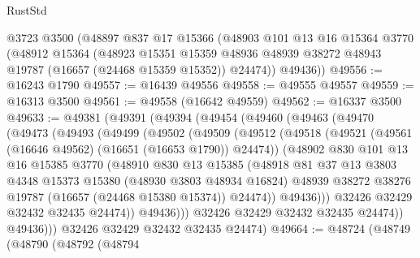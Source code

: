 \begin{lexlean}{RustStd}
\begin{coremodule}
    @3723
    @3500
    (@48897
      @837
      @17
      @15366
      (@48903
        @101
        @13
        @16
        @15364
        @3770
        (@48912
          @15364
          (@48923
            @15351
            @15359
            @48936
            @48939
            @38272
            @48943
            @19787
            (@16657 (@24468 @15359 @15352))
            @24474))
        @49436))
@49556 := @16243 @1790
@49557 := @16439 @49556
@49558 := @49555 @49557
@49559 := @16313 @3500
@49561 := @49558 (@16642 @49559)
@49562 := @16337 @3500
@49633 := @49381
    (@49391
      (@49394
        (@49454
          (@49460
            (@49463
              (@49470
                (@49473
                  (@49493
                    (@49499
                      (@49502
                        (@49509
                          (@49512
                            (@49518
                              (@49521 (@49561 (@16646 @49562) (@16651 (@16653 @1790)) @24474))
                              (@48902
                                @830
                                @101
                                @13
                                @16
                                @15385
                                @3770
                                (@48910
                                  @830
                                  @13
                                  @15385
                                  (@48918
                                    @81
                                    @37
                                    @13
                                    @3803
                                    @4348
                                    @15373
                                    @15380
                                    (@48930 @3803 @48934 @16824)
                                    @48939
                                    @38272
                                    @38276
                                    @19787
                                    (@16657 (@24468 @15380 @15374))
                                    @24474))
                                @49436)))
                          @32426
                          @32429
                          @32432
                          @32435
                          @24474))
                      @49436)))
                @32426
                @32429
                @32432
                @32435
                @24474))
            @49436)))
      @32426
      @32429
      @32432
      @32435
      @24474)
@49664 := @48724
    (@48749
      (@48790
        (@48792
          (@48794

\end{coremodule}
\end{lexlean}
